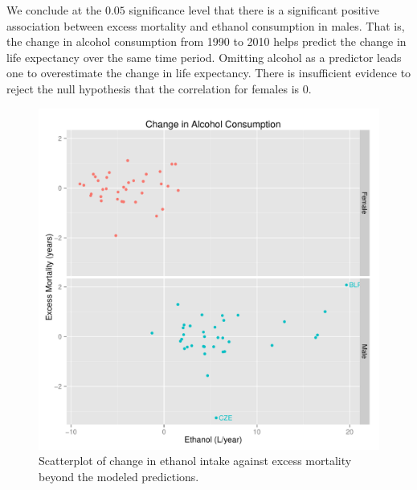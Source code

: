 \documentclass{article}
\begin{document}
We conclude at the $0.05$ significance level that there is a significant positive association between excess mortality and ethanol consumption in males.  That is, the change in alcohol consumption from 1990 to 2010 helps predict the change in life expectancy over the same time period.  Omitting alcohol as a predictor leads one to overestimate the change in life expectancy.  There is insufficient evidence to reject the null hypothesis that the correlation for females is $0$. \\



\begin{figure}
\centering
\includegraphics[width = \textwidth]{etoh_exmort.pdf}
\caption{Scatterplot of change in ethanol intake against excess mortality beyond the modeled predictions.}\label{fig:etoh_excessmortality}
\end{figure}
\end{document}
